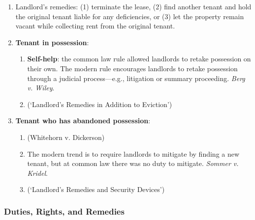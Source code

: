 \begin{enumerate}
    \item Landlord's remedies: (1) terminate the lease, (2) find another 
    tenant and hold the original tenant liable for any deficiencies, or (3) 
    let the property remain vacant while collecting rent from the original 
    tenant.
    \item \textbf{Tenant in possession}:
    \begin{enumerate}
        \item \textbf{Self-help}: the common law rule allowed landlords to 
        retake possession on their own. The modern rule encourages landlords 
        to retake possession through a judicial process---e.g., litigation or 
        summary proceeding. \emph{Berg v. Wiley}.
        \item (`Landlord's Remedies in Addition to Eviction') %
    \end{enumerate}
    \item \textbf{Tenant who has abandoned possession}:
    \begin{enumerate}
        \item (Whitehorn v. Dickerson) %
        \item The modern trend is to require landlords to mitigate by finding 
        a new tenant, but at common law there was no duty to mitigate. 
        \emph{Sommer v. Kridel}.
        \item (`Landlord's Remedies and Security Devices') %
    \end{enumerate}
\end{enumerate}

\subsubsection{Duties, Rights, and Remedies}


